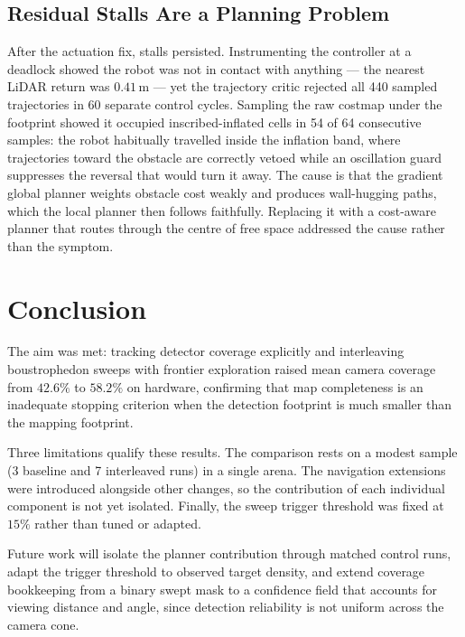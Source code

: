 \documentclass[conference,a4paper,10pt]{IEEEtran}
\begin{document}
\subsection{Residual Stalls Are a Planning Problem}
After the actuation fix, stalls persisted. Instrumenting the controller at a
deadlock showed the robot was not in contact with anything --- the nearest
LiDAR return was \(0.41\,\mathrm{m}\) --- yet the trajectory critic rejected
all 440 sampled trajectories in 60 separate control cycles. Sampling the raw
costmap under the footprint showed it occupied inscribed-inflated cells in 54
of 64 consecutive samples: the robot habitually travelled inside the inflation
band, where trajectories toward the obstacle are correctly vetoed while an
oscillation guard suppresses the reversal that would turn it away. The cause is
that the gradient global planner weights obstacle cost weakly and produces
wall-hugging paths, which the local planner then follows faithfully. Replacing
it with a cost-aware planner that routes through the centre of free space
addressed the cause rather than the symptom.

\section{Conclusion}
The aim was met: tracking detector coverage explicitly and interleaving
boustrophedon sweeps with frontier exploration raised mean camera coverage from
\(42.6\%\) to \(58.2\%\) on hardware, confirming that map completeness is an
inadequate stopping criterion when the detection footprint is much smaller than
the mapping footprint.

Three limitations qualify these results. The comparison rests on a modest
sample (3 baseline and 7 interleaved runs) in a single arena. The navigation
extensions were introduced alongside other changes, so the contribution of each
individual component is not yet isolated. Finally, the sweep trigger threshold
was fixed at \(15\%\) rather than tuned or adapted.

Future work will isolate the planner contribution through matched control runs,
adapt the trigger threshold to observed target density, and extend coverage
bookkeeping from a binary swept mask to a confidence field that accounts for
viewing distance and angle, since detection reliability is not uniform across
the camera cone.
\end{document}
